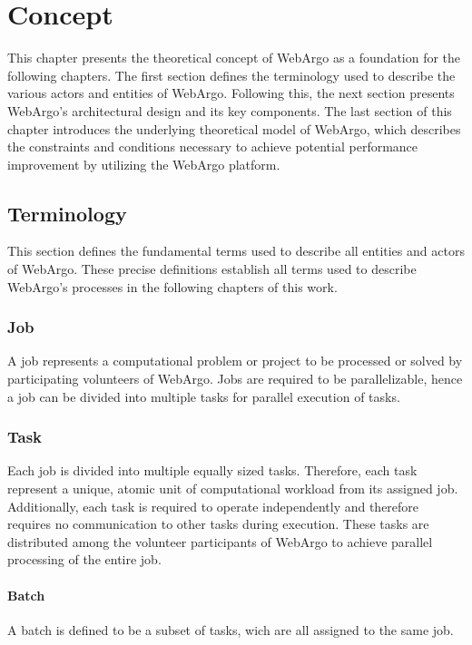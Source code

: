 \chapter{Concept}
\label{ch:concept}
This chapter presents the theoretical concept of WebArgo as a foundation for the following chapters. The first section defines the terminology used to describe the various actors and entities of WebArgo. Following this, the next section presents WebArgo's architectural design and its key components. The last section of this chapter introduces the underlying theoretical model of WebArgo, which describes the constraints and conditions necessary to achieve potential performance improvement by utilizing the WebArgo platform.

\section{Terminology}
\label{sec:concept:terminology}
This section defines the fundamental terms used to describe all entities and actors of WebArgo. These precise definitions establish all terms used to describe WebArgo's processes in the following chapters of this work.

\subsection{Job}
\label{subsec:concept:job}
A job represents a computational problem or project to be processed or solved by participating volunteers of WebArgo. Jobs are required to be parallelizable, hence a job can be divided into multiple tasks for parallel execution of tasks.

\subsection{Task}
\label{subsec:concept:task}
Each job is divided into multiple equally sized tasks. Therefore, each task represent a unique, atomic unit of computational workload from its assigned job. Additionally, each task is required to operate independently and therefore requires no communication to other tasks during execution. These tasks are distributed among the volunteer participants of WebArgo to achieve parallel processing of the entire job.

\subsubsection{Batch}
\label{ssubsec:concept:batch}
A batch is defined to be a subset of tasks, wich are all assigned to the same job.

